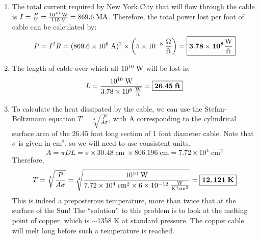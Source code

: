 \documentclass{article}
\begin{document}
    \begin{enumerate}
        \item
        The total current required by New York City that will flow through the cable is $I = \frac{P}{V} = \frac{10^{10}\;\text{W}}{115\;\text{V}} = 869.6\;\text{M}\text{A}$. Therefore, the total power lost per foot of cable can be calculated by:
        \[P = I^2R = (869.6 \times 10^6\;\text{A})^2 \times \left(5\times10^{-8}\;\frac{\Omega}{\text{ft}}\right) = \boxed{\mathbf{3.78\times10^{8} \frac{\text{W}}{\text{ft}}}} \] 
        \item
        The length of cable over which all $10^{10}\;\text{W}$ will be lost is:
        \[L = \frac{10^{10}\;\text{W}}{3.78 \times 10^{8}\;\frac{\text{W}}{\text{ft}}} = \boxed{\mathbf{26.45\;ft}}\]
        \item
        To calculate the heat dissipated by the cable, we can use the Stefan-Boltzmann equation $T = \sqrt[4]{\frac{P}{A\sigma}}$, with A corresponding to the cylindrical surface area of the 26.45 foot long section of 1 foot diameter cable. Note that $\sigma$ is given in cm$^2$, so we will need to use consistent units.
        \[A = \pi DL = \pi \times 30.48\;{\ensuremath{\text{cm}}}\;\times 806.196\;{\ensuremath{\text{cm}}} = 7.72 \times 10^4\;{\ensuremath{\text{cm}}}^2\]
        Therefore,
        \[T = \sqrt[4]{\frac{P}{A\sigma}} = \sqrt[4]{\frac{10^{10}\;\text{W}}{7.72 \times 10^4\;{\text{cm}}^2 \times 6 \times 10^{-12}\;\frac{\text{W}}{\text{K}^4\text{cm}^2}}} = \boxed{\mathbf{12,121\;K}} \]
        This is indeed a preposterous temperature, more than twice that at the surface of the Sun! The ``solution'' to this problem is to look at the melting point of copper, which is $\sim$1358 K at standard pressure. The copper cable will melt long before such a temperature is reached.
    \end{enumerate}
    
\end{document}
